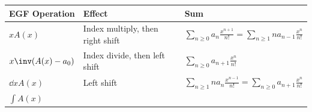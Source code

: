 \begin{longtable}[]{@{}lll@{}}
\toprule
\begin{minipage}[b]{0.30\columnwidth}\raggedright
EGF Operation\strut
\end{minipage} & \begin{minipage}[b]{0.30\columnwidth}\raggedright
Effect\strut
\end{minipage} & \begin{minipage}[b]{0.30\columnwidth}\raggedright
Sum\strut
\end{minipage}\tabularnewline
\midrule
\endhead
\begin{minipage}[t]{0.30\columnwidth}\raggedright
\(xA(x)\)\strut
\end{minipage} & \begin{minipage}[t]{0.30\columnwidth}\raggedright
Index multiply, then right shift\strut
\end{minipage} & \begin{minipage}[t]{0.30\columnwidth}\raggedright
\(\displaystyle\sum_{n\geq 0}a_{n} \frac{x^{n+1}}{n!} = \displaystyle\sum_{n\geq 1}n a_{n-1} \frac{x^n}{n!}\)\strut
\end{minipage}\tabularnewline
\begin{minipage}[t]{0.30\columnwidth}\raggedright
\(x\inv (A(x) - a_0)\)\strut
\end{minipage} & \begin{minipage}[t]{0.30\columnwidth}\raggedright
Index divide, then left shift\strut
\end{minipage} & \begin{minipage}[t]{0.30\columnwidth}\raggedright
\(\displaystyle\sum_{n\geq 0}a_{n+1} \frac{x^n}{n!}\)\strut
\end{minipage}\tabularnewline
\begin{minipage}[t]{0.30\columnwidth}\raggedright
\(\dd{}{x}A(x)\)\strut
\end{minipage} & \begin{minipage}[t]{0.30\columnwidth}\raggedright
Left shift\strut
\end{minipage} & \begin{minipage}[t]{0.30\columnwidth}\raggedright
\(\displaystyle\sum_{n\geq 1}n a_n \frac{x^{n-1}}{n!} = \displaystyle\sum_{n\geq 0}a_{n+1} \frac{x^n}{n!}\)\strut
\end{minipage}\tabularnewline
\begin{minipage}[t]{0.30\columnwidth}\raggedright
\(\displaystyle\int A(x)\)\strut
\end{minipage} & \begin{minipage}[t]{0.30\columnwidth}\raggedright

\end{minipage}
\end{longtable}

